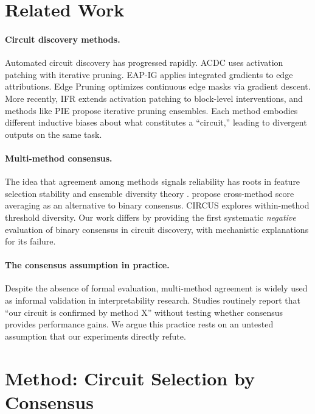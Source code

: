 \documentclass[11pt,a4paper]{article}
\begin{document}
\section{Related Work}

\paragraph{Circuit discovery methods.}
Automated circuit discovery has progressed rapidly. ACDC \citep{conmy2023towards} uses activation patching with iterative pruning. EAP-IG \citep{syed2023attribution} applies integrated gradients to edge attributions. Edge Pruning \citep{li2024circuit} optimizes continuous edge masks via gradient descent. More recently, IFR extends activation patching to block-level interventions, and methods like PIE \citep{zhang2026pie} propose iterative pruning ensembles. Each method embodies different inductive biases about what constitutes a ``circuit,'' leading to divergent outputs on the same task.

\paragraph{Multi-method consensus.}
The idea that agreement among methods signals reliability has roots in feature selection stability \citep{nogueira2016measuring} and ensemble diversity theory \citep{kuncheva2003measures}. \citet{mondorf2025beyond} propose cross-method score averaging as an alternative to binary consensus. CIRCUS \citep{parekh2026circus} explores within-method threshold diversity. Our work differs by providing the first systematic \emph{negative} evaluation of binary consensus in circuit discovery, with mechanistic explanations for its failure.

\paragraph{The consensus assumption in practice.}
Despite the absence of formal evaluation, multi-method agreement is widely used as informal validation in interpretability research. Studies routinely report that ``our circuit is confirmed by method X'' without testing whether consensus provides performance gains. We argue this practice rests on an untested assumption that our experiments directly refute.

\section{Method: Circuit Selection by Consensus}
\label{sec:method}
\end{document}
